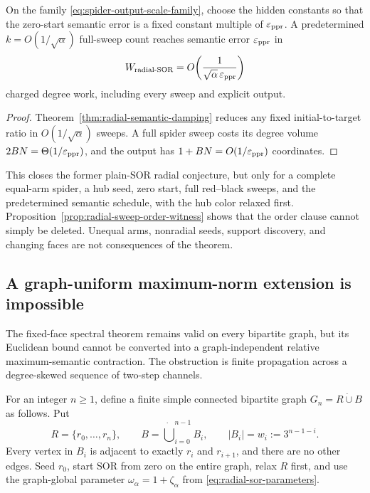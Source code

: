 \begin{corollary}
\label{cor:radial-output-scale-sor}
On the family \eqref{eq:spider-output-scale-family}, choose the hidden
constants so that the zero-start semantic error is a fixed constant multiple
of $\varepsilon_{\rm ppr}$.  A predetermined
$k=O(1/\sqrt\alpha)$ full-sweep count reaches semantic error
$\varepsilon_{\rm ppr}$ in
\begin{equation}
 W_{\rm radial\text{-}SOR}
 =O\!\left(
  \frac1{\sqrt\alpha\,\varepsilon_{\rm ppr}}
 \right)
 \label{eq:radial-output-scale-sor-work}
\end{equation}
charged degree work, including every sweep and explicit output.
\end{corollary}

\begin{proof}
Theorem~\ref{thm:radial-semantic-damping} reduces any fixed initial-to-target
ratio in $O(1/\sqrt\alpha)$ sweeps.  A full spider sweep costs its degree
volume $2BN=\Theta(1/\varepsilon_{\rm ppr})$, and the output has
$1+BN=O(1/\varepsilon_{\rm ppr})$ coordinates.
\end{proof}

This closes the former plain-SOR radial conjecture, but only for a complete
equal-arm spider, a hub seed, zero start, full red--black sweeps, and the
predetermined semantic schedule, with the hub color relaxed first.
Proposition~\ref{prop:radial-sweep-order-witness} shows that the order clause
cannot simply be deleted.  Unequal arms, nonradial seeds, support discovery,
and changing faces are not consequences of the theorem.

\subsection{A graph-uniform maximum-norm extension is impossible}

The fixed-face spectral theorem remains valid on every bipartite graph, but
its Euclidean bound cannot be converted into a graph-independent relative
maximum-semantic contraction.  The obstruction is finite propagation across
a degree-skewed sequence of two-step channels.

For an integer $n\geq1$, define a finite simple connected bipartite graph
$G_n=R\mathbin{\dot\cup}B$ as follows.  Put
\begin{equation*}
 R=\{r_0,\ldots,r_n\},
 \qquad
 B=\mathbin{\dot\bigcup}_{i=0}^{n-1}B_i,
 \qquad
 |B_i|=w_i:=3^{n-1-i}.
\end{equation*}
Every vertex in $B_i$ is adjacent to exactly $r_i$ and $r_{i+1}$, and there
are no other edges.  Seed $r_0$, start SOR from zero on the entire graph,
relax $R$ first, and use the graph-global parameter
$\omega_\alpha=1+\zeta_\alpha$ from
\eqref{eq:radial-sor-parameters}.

